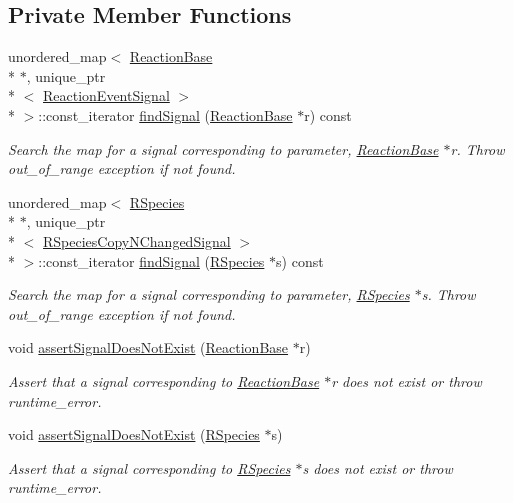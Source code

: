 \subsection*{Private Member Functions}
\begin{DoxyCompactItemize}
\item 
unordered\+\_\+map$<$ \hyperlink{classReactionBase}{Reaction\+Base} \\*
$\ast$, unique\+\_\+ptr\\*
$<$ \hyperlink{Signaling_8h_a474e8de96ad1d2e184edd4655b5367a5}{Reaction\+Event\+Signal} $>$\\*
 $>$\+::const\+\_\+iterator \hyperlink{classChemSignal_a1d97f97bcba6af500da85f1422d89921}{find\+Signal} (\hyperlink{classReactionBase}{Reaction\+Base} $\ast$r) const 
\begin{DoxyCompactList}\small\item\em Search the map for a signal corresponding to parameter, \hyperlink{classReactionBase}{Reaction\+Base} $\ast$r. Throw out\+\_\+of\+\_\+range exception if not found. \end{DoxyCompactList}\item 
unordered\+\_\+map$<$ \hyperlink{classRSpecies}{R\+Species} \\*
$\ast$, unique\+\_\+ptr\\*
$<$ \hyperlink{Signaling_8h_a0e8f1e8752c518bbfbcfe0147eca4587}{R\+Species\+Copy\+N\+Changed\+Signal} $>$\\*
 $>$\+::const\+\_\+iterator \hyperlink{classChemSignal_a93bb74fad6645d059bf85957ea34f4a8}{find\+Signal} (\hyperlink{classRSpecies}{R\+Species} $\ast$s) const 
\begin{DoxyCompactList}\small\item\em Search the map for a signal corresponding to parameter, \hyperlink{classRSpecies}{R\+Species} $\ast$s. Throw out\+\_\+of\+\_\+range exception if not found. \end{DoxyCompactList}\item 
void \hyperlink{classChemSignal_adfa6655413afc3a602a8f76ad6b71a98}{assert\+Signal\+Does\+Not\+Exist} (\hyperlink{classReactionBase}{Reaction\+Base} $\ast$r)
\begin{DoxyCompactList}\small\item\em Assert that a signal corresponding to \hyperlink{classReactionBase}{Reaction\+Base} $\ast$r does not exist or throw runtime\+\_\+error. \end{DoxyCompactList}\item 
void \hyperlink{classChemSignal_a17510f00f6775f8bfdf9a5ed2844251a}{assert\+Signal\+Does\+Not\+Exist} (\hyperlink{classRSpecies}{R\+Species} $\ast$s)
\begin{DoxyCompactList}\small\item\em Assert that a signal corresponding to \hyperlink{classRSpecies}{R\+Species} $\ast$s does not exist or throw runtime\+\_\+error. \end{DoxyCompactList}\end{DoxyCompactItemize}
